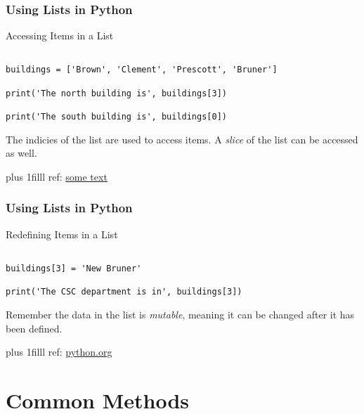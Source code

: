 \documentclass[fleqn]{beamer} %
\newcommand{\sectiontitleII}{Using Lists in Python}
\newcommand{\sectiontitleIII}{Common Methods}
\newcommand{\btVFill}{\vskip0pt plus 1filll}
\begin{document}
	\begin{frame}[containsverbatim] \small
		\frametitle{\sectiontitleII}
		
		Accessing Items in a List	

		\begin{lstlisting}

buildings = ['Brown', 'Clement', 'Prescott', 'Bruner']

print('The north building is', buildings[3])

print('The south building is', buildings[0])
		\end{lstlisting}

\vspace*{5mm}
The indicies of the list are used to access items. A {\it slice} of the list can be accessed as well. 

		\btVFill
		\tiny{ref: \href{some link}{some text}}
	\end{frame}	

	\begin{frame}[containsverbatim] \small
		\frametitle{\sectiontitleII}
		
		Redefining Items in a List	

		\begin{lstlisting}

buildings[3] = 'New Bruner'

print('The CSC department is in', buildings[3])

		\end{lstlisting}


		\vspace*{10mm}
		Remember the data in the list is {\it mutable}, meaning it can be changed after it has been defined.
	

		\btVFill
		\tiny{ref: \href{https://docs.python.org/3/tutorial/datastructures.html#more-on-lists}{python.org}}
	\end{frame}	


\section{\sectiontitleIII}
\end{document}
